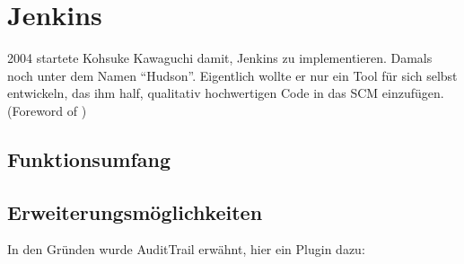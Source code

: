 \pagebreak

\chapter{Jenkins}
2004 startete Kohsuke Kawaguchi damit, Jenkins zu implementieren. Damals noch unter dem Namen "`Hudson"'. Eigentlich wollte er nur ein Tool für sich selbst entwickeln, das ihm half, qualitativ hochwertigen Code in das SCM einzufügen. (Foreword of \cite{smart2011jenkins})
\section{Funktionsumfang}
\section{Erweiterungsmöglichkeiten}
In den Gründen wurde AuditTrail erwähnt, hier ein Plugin dazu: \cite{jenkins-audit-trail}
